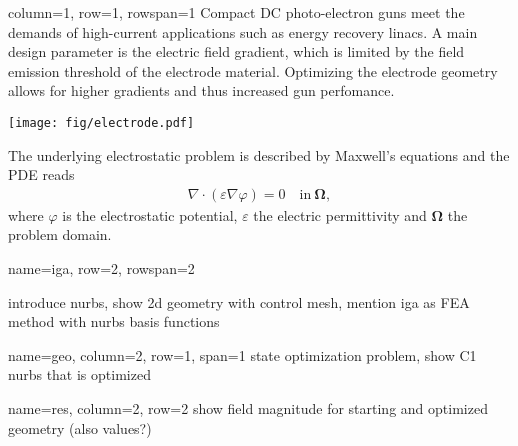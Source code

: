 \documentclass[
   accentcolor=9b,
   boxstyle=boxed
   ]{tudasciposter}
\begin{document}
\begin{tcbposter}[poster={columns=2, rows=3, spacing=1cm}]

\begin{posterboxenv}[title=Motivation]{column=1, row=1, rowspan=1}
   Compact DC photo-electron guns meet the demands of high-current applications such as energy recovery linacs. A main design parameter is the electric field gradient, which is limited by the field emission threshold of the electrode material. Optimizing the electrode geometry allows for higher gradients and thus increased gun perfomance.
   \begin{center}
      \texttt{[image: fig/electrode.pdf]}
   \end{center}
   The underlying electrostatic problem is described by Maxwell's equations and the PDE reads
   \begin{align*}
      \nabla \cdot (\varepsilon \nabla \varphi) = 0 \quad \mathrm{in}\ \boldsymbol{\Omega},
   \end{align*}
   where $\varphi$ is the electrostatic potential, $\varepsilon$ the electric permittivity and $\boldsymbol{\Omega}$ the problem domain.
\end{posterboxenv}

\begin{posterboxenv}[title=Isogeometric Analysis]{name=iga, row=2, rowspan=2}
      \hfill
      

   introduce nurbs, show 2d geometry with control mesh, mention iga as FEA method with nurbs basis functions
\end{posterboxenv}

\begin{posterboxenv}[title=Geometry Optimization]{name=geo, column=2, row=1, span=1}
   state optimization problem, show C1 nurbs that is optimized
\end{posterboxenv}


\begin{posterboxenv}[title=Results]{name=res, column=2, row=2}
   show field magnitude for starting and optimized geometry (also values?)
\end{posterboxenv}

\end{tcbposter}
\end{document}
